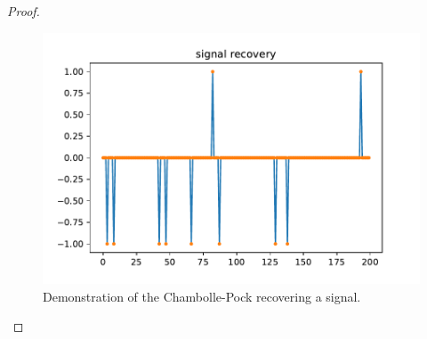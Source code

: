\documentclass[11pt]{amsart}
\begin{document}
\begin{enumerate}
\begin{proof}
  \begin{figure}
    \centering
    \includegraphics[width=\textwidth]{signal_recovery.pdf}
    \caption{Demonstration of the Chambolle-Pock recovering a signal.}
    \label{fig:signal_recovery}
  \end{figure}
\end{proof}



\end{enumerate}
\end{document}
